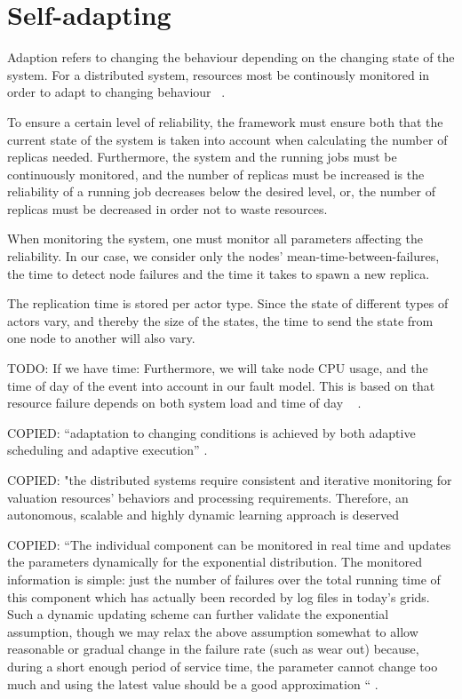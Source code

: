 \documentclass{cslthse-msc}
\begin{document}
\section{Self-adapting} \label{subsec:design_self_adapting}
Adaption refers to changing the behaviour depending on the changing state of the system. For a distributed system, resources most be continously monitored in order to adapt to changing behaviour ~\cite{imprRelAdaptRL}.

To ensure a certain level of reliability, the framework must ensure both that the current state of the system is taken into account when calculating the number of replicas needed. Furthermore, the system and the running jobs must be continuously monitored, and the number of replicas must be increased is the reliability of a running job decreases below the desired level, or, the number of replicas must be decreased in order not to waste resources.

When monitoring the system, one must monitor all parameters affecting the reliability. In our case, we consider only the nodes' mean-time-between-failures, the time to detect node failures and the time it takes to spawn a new replica.

The replication time is stored per actor type. Since the state of different types of actors vary, and thereby the size of the states, the time to send the state from one node to another will also vary. 

TODO: If we have time:
Furthermore, we will take node CPU usage, and the time of day of the event into account in our fault model. This is based on that resource failure depends on both system load and time of day ~\cite{implicationsOfFailures} \cite{studyOfFailures}.

\iffalse
COPIED: “adaptation to changing conditions is achieved by both adaptive scheduling and adaptive execution” \cite{evalOfGridRel}.

COPIED:
"the distributed systems require consistent and iterative monitoring for valuation resources’ behaviors and processing requirements. Therefore, an autonomous, scalable and highly dynamic learning approach is deserved \cite{imprRelAdaptRL}


COPIED:
“The individual component can be monitored in real time and updates the parameters dynamically for the exponential distribution. The monitored information is simple: just the number of failures over the total running time of this component which has actually been recorded by log files in today’s grids. Such a dynamic updating scheme can further validate the exponential assumption, though we may relax the above assumption somewhat to allow reasonable or gradual change in the failure rate (such as wear out) because, during a short enough period of service time, the parameter cannot change too much and using the latest value should be a good approximation “ \cite{hierarchicalRelModeling}.
\end{document}
